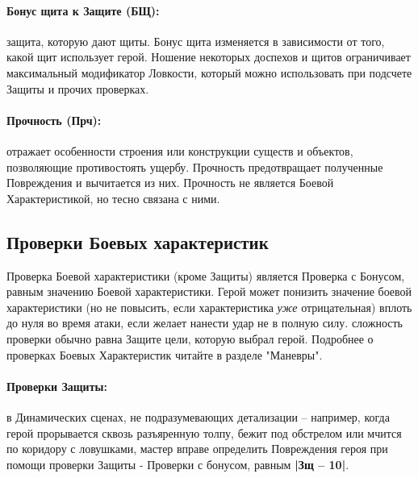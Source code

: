 \paragraph{Бонус щита к Защите (БЩ):} защита, которую дают щиты. Бонус щита изменяется в зависимости от того, какой щит использует герой.
\newline Ношение некоторых доспехов и щитов ограничивает максимальный модификатор Ловкости, который можно использовать при подсчете Защиты и прочих проверках.
\paragraph{Прочность (Прч):} отражает особенности строения или конструкции существ и объектов, позволяющие противостоять ущербу. Прочность предотвращает полученные Повреждения и вычитается из них.
\newline Прочность не является Боевой Характеристикой, но тесно связана с ними.

\subsection{Проверки Боевых характеристик}
Проверка Боевой характеристики (кроме Защиты) является Проверка с Бонусом, равным значению Боевой характеристики.
\newline Герой может понизить значение боевой характеристики (но не повысить, если характеристика \textit{уже} отрицательная) вплоть до нуля во время атаки, если желает нанести удар не в полную силу.
\newline сложность проверки обычно равна Защите цели, которую выбрал герой.
\newline Подробнее о проверках Боевых Характеристик читайте в разделе "Маневры".

\paragraph{Проверки Защиты:} в Динамических сценах, не подразумевающих детализации – например, когда герой прорывается сквозь разъяренную толпу, бежит под обстрелом или мчится по коридору с ловушками, мастер вправе определить Повреждения героя при помощи проверки Защиты - Проверки с бонусом, равным \textbf{|Зщ – 10|}.

